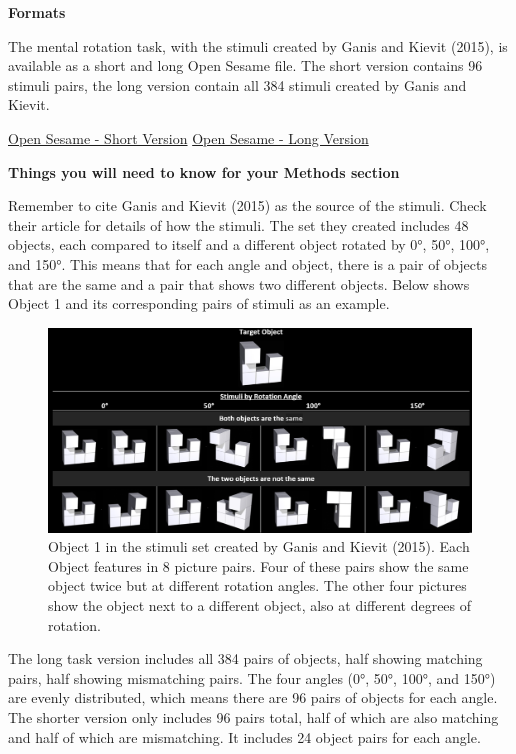 \documentclass[
]{book}
\begin{document}
\textbf{Formats}

The mental rotation task, with the stimuli created by Ganis and Kievit (2015), is available as a short and long Open Sesame file. The short version contains 96 stimuli pairs, the long version contain all 384 stimuli created by Ganis and Kievit.

\href{link\%20to\%20file}{Open Sesame - Short Version} \textbar{} \href{link\%20to\%20file}{Open Sesame - Long Version}

\textbf{Things you will need to know for your Methods section}

Remember to cite Ganis and Kievit (2015) as the source of the stimuli. Check their article for details of how the stimuli.
The set they created includes 48 objects, each compared to itself and a different object rotated by 0°, 50°, 100°, and 150°. This means that for each angle and object, there is a pair of objects that are the same and a pair that shows two different objects. Below shows Object 1 and its corresponding pairs of stimuli as an example.

\begin{figure}

{\centering \includegraphics[width=0.99\linewidth]{images/RotationOverview} 

}

\caption{Object 1 in the stimuli set created by Ganis and Kievit (2015). Each Object features in 8 picture pairs. Four of these pairs show the same object twice but at different rotation angles. The other four pictures show the object next to a different object, also at different degrees of rotation.}\label{fig:Figure5-2}
\end{figure}

The long task version includes all 384 pairs of objects, half showing matching pairs, half showing mismatching pairs. The four angles (0°, 50°, 100°, and 150°) are evenly distributed, which means there are 96 pairs of objects for each angle. The shorter version only includes 96 pairs total, half of which are also matching and half of which are mismatching. It includes 24 object pairs for each angle.
\end{document}
